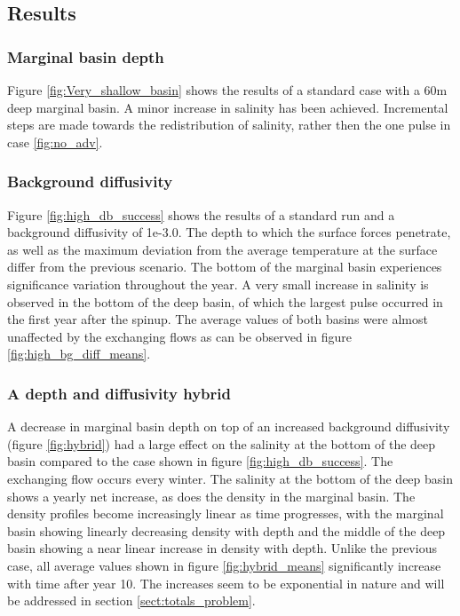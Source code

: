 \documentclass[twocolumn]{article}
\begin{document}



\subsection{Results}

\subsubsection{Marginal basin depth}
\label{sect:mar_basin_depth}
Figure \ref{fig:Very_shallow_basin} shows the results of a standard case with a 60m deep marginal basin. A minor increase in salinity has been achieved. Incremental steps are made towards the redistribution of salinity, rather then the one pulse in case \ref{fig:no_adv}. 


\subsubsection{Background diffusivity}
Figure \ref{fig:high_db_success} shows the results of a standard run and a background diffusivity of 1e-3.0. The depth to which the surface forces penetrate, as well as the maximum deviation from the average temperature at the surface differ from the previous scenario. The bottom of the marginal basin experiences significance variation throughout the year. A very small increase in salinity is observed in the bottom of the deep basin, of which the largest pulse occurred in the first year after the spinup. The average values of both basins were almost unaffected by the exchanging flows as can be observed in figure \ref{fig:high_bg_diff_means}.

\subsubsection{A depth and diffusivity hybrid}
A decrease in marginal basin depth on top of an increased background diffusivity (figure \ref{fig:hybrid}) had a large effect on the salinity at the bottom of the deep basin compared to the case shown in figure \ref{fig:high_db_success}. The exchanging flow occurs every winter. The salinity at the bottom of the deep basin shows a yearly net increase, as does the density in the marginal basin. The density profiles become increasingly linear as time progresses, with the marginal basin showing linearly decreasing density with depth and the middle of the deep basin showing a near linear increase in density with depth. 
Unlike the previous case, all average values shown in figure \ref{fig:hybrid_means} significantly increase with time after year 10. The increases seem to be exponential in nature and will be addressed in section \ref{sect:totals_problem}. 
\end{document}
